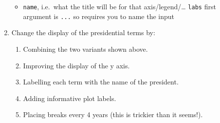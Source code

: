 \documentclass[]{book}
\providecommand{\tightlist}{%
  \setlength{\itemsep}{0pt}\setlength{\parskip}{0pt}}
\theoremstyle{definition}
\theoremstyle{definition}
\theoremstyle{definition}
\theoremstyle{remark}
\begin{document}
\begin{enumerate}
  \begin{itemize}
  \tightlist
  \item
    \texttt{name}, i.e.~what the title will be for that
    axis/legend/\ldots{} \texttt{labs} first argument is \texttt{...} so
    requires you to name the input
  \end{itemize}
\item
  Change the display of the presidential terms by:

  \begin{enumerate}
  \def\labelenumii{\arabic{enumii}.}
  \tightlist
  \item
    Combining the two variants shown above.
  \item
    Improving the display of the y axis.
  \item
    Labelling each term with the name of the president.
  \item
    Adding informative plot labels.
  \item
    Placing breaks every 4 years (this is trickier than it seems!).
  \end{enumerate}
\end{enumerate}
\end{document}
